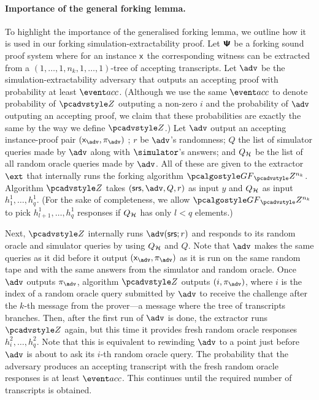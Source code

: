 \paragraph{Importance of the general forking lemma.}
To highlight the importance of the generalised forking lemma, we outline 
how it is used in our forking simulation-extractability proof.  Let $\bm{\mathsf{\Psi}}$ be a
forking sound proof system where for an instance $\mathsf{x}$ the
corresponding witness can be extracted from a
$(1, \ldots, 1, n_k, 1, \ldots, 1)$-tree of accepting transcripts.  Let $\advse$
be the simulation-extractability adversary that outputs an accepting proof with
probability at least $\accProb$. (Although we use the same $\accProb$ to denote
probability of $\zdv$ outputing a non-zero $i$ and the probability of $\advse$
outputing an accepting proof, we claim that these probabilities are exactly the
same by the way we define $\zdv$.) Let $\advse$ output an accepting instance-proof pair
$(\inp_{\advse},\zkproof_{\advse})$ ; $r$ be $\advse$'s
randomness; $Q$ the list of simulator queries made by $\advse$ along with 
$\simulator$'s answers; %
and $Q_{\mathcal{H}}$ be the list of all random oracle
queries made by $\advse$.  All of these are given to the extractor $\ext$ that
internally runs the forking algorithm $\genforking_\zdv^{n_k}$.  Algorithm $\zdv$
takes $(\srs, \advse,Q, r)$ as input $y$ and $Q_{\mathcal{H}}$ as input $h_1^1, \ldots,
h_q^1$. 
(For the sake of completeness, we allow $\genforking_\zdv^{n_k}$ to
pick $h^1_{l + 1}, \ldots, h^1_q$ responses if $Q_{\mathcal{H}}$ has only $l < q$
elements.)  

Next, $\zdv$ internally runs $\advse(\srs; r)$ %
and responds to its random
oracle and simulator queries by using $Q_{\mathcal{H}}$ and $Q$. Note that $\advse$ makes
the same queries as it did before it output $(\inp_{\advse}, \zkproof_{\advse})$
as it is run on the same random tape and with the same answers from the
simulator and random oracle. Once $\advse$ outputs 
$\zkproof_{\advse}$, algorithm $\zdv$ outputs $(i, \zkproof_{\advse})$, where
$i$ is the index of a random oracle query submitted by $\advse$ to receive the challenge after the
$k$-th message from the prover---a message where the tree of transcripts
branches.
Then, after the first run of $\advse$ is done, the extractor runs $\zdv$ again,
but this time it provides fresh random oracle responses $h^2_i, \ldots,
h^2_q$. Note that this is equivalent to rewinding $\advse$ to a point just
before $\advse$ is about to ask its $i$-th random oracle
query. The probability that the adversary produces an accepting transcript with the
fresh random oracle responses is at least $\accProb$. This continues until the
required number of transcripts is obtained. 

